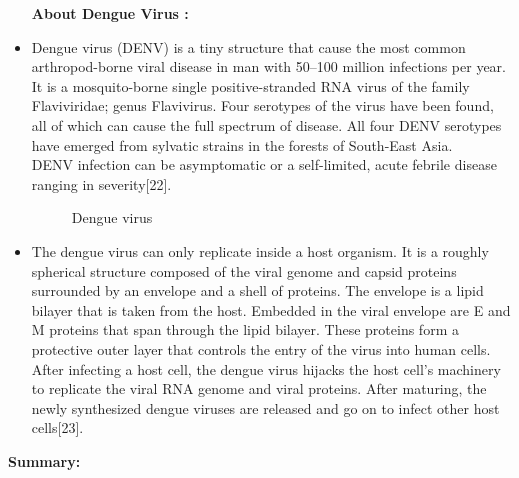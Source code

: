 \documentclass[11pt]{exam}
\begin{document}
\begin{questions}
\begin{itemize}
\textbf{About Dengue Virus :} \\
\item Dengue virus (DENV) is a tiny structure that cause the most common arthropod-borne viral disease in man with 50–100 million infections per year. \\
It is a mosquito-borne single positive-stranded RNA virus of the family Flaviviridae; genus Flavivirus. Four serotypes of the virus have been found, all of which can cause the full spectrum of disease. All four DENV serotypes have emerged from sylvatic strains in the forests of South-East Asia. \\
DENV infection can be asymptomatic or a self-limited, acute febrile disease ranging in severity[22].\\
\begin{figure}[H]
  \centering
  \hfill
  \hfill
  \caption{Dengue virus}
  \label{Dengue vectors }
\end{figure} 

\item The dengue virus can only replicate inside a host organism. It is a roughly spherical structure composed of the viral genome and capsid proteins surrounded by an envelope and a shell of proteins. The envelope is a lipid bilayer that is taken from the host. Embedded in the viral envelope are E and M proteins that span through the lipid bilayer. These proteins form a protective outer layer that controls the entry of the virus into human cells. \\
After infecting a host cell, the dengue virus hijacks the host cell's machinery to replicate the viral RNA genome and viral proteins. After maturing, the newly synthesized dengue viruses are released and go on to infect other host cells[23].\\
\end{itemize}
\textbf{Summary:} \\
\\ \\ \\


\end{questions}
\end{document}
